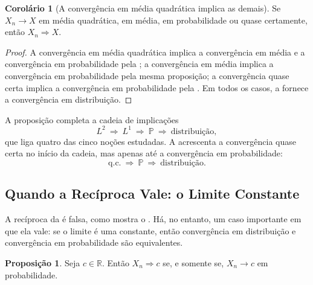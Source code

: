 \documentclass[12pt,portuguese]{article}
\theoremstyle{definition}
\newtheorem{proposition}[proposition]{Proposição}
\newtheorem{corollary}[corollary]{Corolário}
\theoremstyle{plainexercise}
\theoremstyle{starredexercise}
\theoremstyle{definition}
\begin{document}
\begin{corollary}[A convergência em média quadrática implica as demais]
\label{cor:l2-dist}
Se $X_n\to X$ em média quadrática, em média, em probabilidade ou quase
certamente, então $X_n\Rightarrow X$.
\end{corollary}

\begin{proof}
A convergência em média quadrática implica a convergência em média e a
convergência em probabilidade pela ; a convergência em média
implica a convergência em probabilidade pela mesma proposição; a convergência
quase certa implica a convergência em probabilidade pela
. Em todos os casos, a
 fornece a convergência em distribuição.
\end{proof}

A proposição completa a cadeia de implicações
\[
L^2\ \Longrightarrow\ L^1\ \Longrightarrow\ \mathbb{P}
\ \Longrightarrow\ \text{distribuição},
\]
que liga quatro das cinco noções estudadas. A
 acrescenta a convergência quase certa no início da
cadeia, mas apenas até a convergência em probabilidade:
\[
\text{q.c.}\ \Longrightarrow\ \mathbb{P}\ \Longrightarrow\ \text{distribuição}.
\]

\subsection{Quando a Recíproca Vale: o Limite Constante}\label{subsec:dist-constante}

A recíproca da  é falsa, como mostra o
. Há, no entanto, um caso importante em que ela vale: se
o limite é uma constante, então convergência em distribuição e convergência em
probabilidade são equivalentes.

\begin{proposition}\label{prop:dist-constante}
Seja $c\in\mathbb{R}$. Então $X_n\Rightarrow c$ se, e somente se,
$X_n\to c$ em probabilidade.
\end{proposition}
\end{document}
